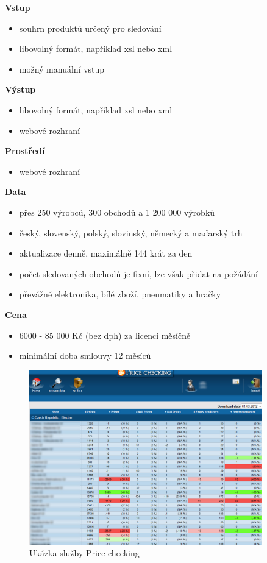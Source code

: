 \documentclass[thesis=B,czech]{FITthesis}[2012/06/26]
\begin{document}
\textbf{Vstup}
\begin{itemize}
\item souhrn produktů určený pro sledování
\item libovolný formát, například xsl nebo xml
\item možný manuální vstup
\end{itemize}

\textbf{Výstup}
\begin{itemize}
\item libovolný formát, například xsl nebo xml
\item webové rozhraní
\end{itemize}

\textbf{Prostředí}
\begin{itemize}
\item webové rozhraní
\end{itemize}

\textbf{Data}
\begin{itemize}
\item přes 250 výrobců, 300 obchodů a 1 200 000 výrobků
\item český, slovenský, polský, slovinský, německý a maďarský trh
\item aktualizace denně, maximálně 144 krát za den
\item počet sledovaných obchodů je fixní, lze však přidat na požádání
\item převážně elektronika, bílé zboží, pneumatiky a hračky
\end{itemize}

\textbf{Cena}
\begin{itemize}
\item 6000 - 85 000 Kč (bez dph) za licenci měsíčně
\item minimální doba smlouvy 12 měsíců
\end{itemize}

\begin{figure}[h]\centering
 	\includegraphics[width=0.9\textwidth]{resources/priceChecking}
	\caption[Price checking]{Ukázka služby Price checking}\label{fig:priceChecking}
\end{figure}
\end{document}
